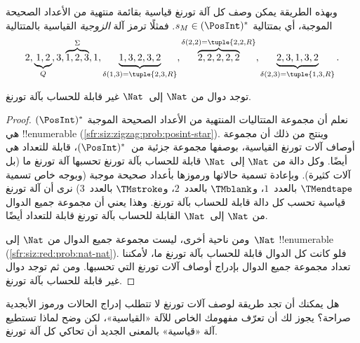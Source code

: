 \documentclass[../../../include/open-logic-section]{subfiles}
\begin{document}
\begin{explain}
وبهذه الطريقة يمكن وصف كل آلة تورنغ قياسية بقائمة منتهية من الأعداد
الصحيحة الموجبة، أي بمتتالية $s_M\in(\PosInt)^*$. فمثلًا ترمز آلة
\emph{الزوجية} القياسية بالمتتالية
\[
2, \underbrace{1, 2}_Q, 3, \overbrace{1, 2, 3}^\Sigma, 1, \underbrace{1, 3, 2, 3, 2}_{\delta(1,3) = \tuple{2,3,R}},
\overbrace{2, 2, 2, 2, 2}^{\delta(2,2) = \tuple{2,2,R}},
\underbrace{2, 3, 1, 3, 2}_{\delta(2,3) = \tuple{1,3,R}}.
\]
\end{explain}

\begin{thm}
توجد دوال من $\Nat$ إلى~$\Nat$ غير قابلة للحساب بآلة تورنغ.
\end{thm}

\begin{proof}
نعلم أن مجموعة المتتاليات المنتهية من الأعداد الصحيحة الموجبة
$(\PosInt)^*$ هي !!{enumerable}
(\cref{sfr:siz:zigzag:prob:posint-star}). وينتج من ذلك أن مجموعة أوصاف
آلات تورنغ القياسية، بوصفها مجموعة جزئية من~$(\PosInt)^*$، قابلة
للتعداد هي أيضًا. وكل دالة من $\Nat$ إلى~$\Nat$ قابلة للحساب بآلة
تورنغ تحسبها آلة تورنغ ما (بل آلات كثيرة). وبإعادة تسمية حالاتها
ورموزها بأعداد صحيحة موجبة (وبوجه خاص تسمية $\TMendtape$ بالعدد~$1$،
و$\TMblank$ بالعدد~$2$، و$\TMstroke$ بالعدد~$3$) نرى أن آلة تورنغ
قياسية تحسب كل دالة قابلة للحساب بآلة تورنغ. وهذا يعني أن مجموعة جميع
الدوال من $\Nat$ إلى~$\Nat$ القابلة للحساب بآلة تورنغ قابلة للتعداد
أيضًا.

ومن ناحية أخرى، ليست مجموعة جميع الدوال من $\Nat$ إلى~$\Nat$
!!{enumerable} (\cref{sfr:siz:red:prob:nat-nat}). فلو كانت كل الدوال
قابلة للحساب بآلة تورنغ ما، لأمكننا تعداد مجموعة جميع الدوال بإدراج
أوصاف آلات تورنغ التي تحسبها. ومن ثم توجد دوال غير قابلة للحساب بآلة
تورنغ.
\end{proof}

\begin{prob}
  هل يمكنك أن تجد طريقة لوصف آلات تورنغ لا تتطلب إدراج الحالات ورموز
  الأبجدية صراحة؟ يجوز لك أن تعرّف مفهومك الخاص للآلة «القياسية»، لكن
  وضح لماذا تستطيع آلة «قياسية» بالمعنى الجديد أن تحاكي كل آلة تورنغ.
\end{prob}
\end{document}
